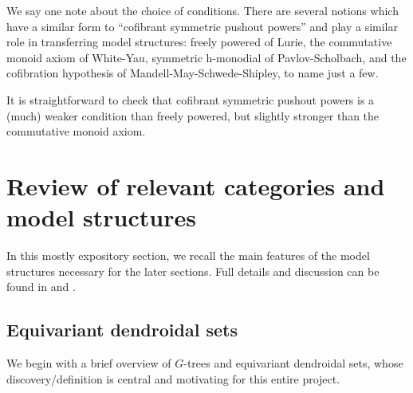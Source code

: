 \documentclass[a4paper,10pt
,draft
]{article}%
\renewcommand{\1}{\eta}%
\begin{document}
{  \begin{remark}
        We say one note about the choice of conditions. There are several notions which have a similar form to
        ``cofibrant symmetric pushout powers'' and play a similar role in transferring model structures:
        freely powered of Lurie,
        the commutative monoid axiom of White-Yau,
        symmetric h-monodial of Pavlov-Scholbach,
        and the cofibration hypothesis of Mandell-May-Schwede-Shipley,
        to name just a few.

        It is straightforward to check that cofibrant symmetric pushout powers is a (much) weaker condition than freely powered,
        but slightly stronger than the commutative monoid axiom.

  \end{remark}


} %









\newpage

\section{Review of relevant categories and model structures}

In this mostly expository section, we recall the main features of the model structures necessary for the later sections.
Full details and discussion can be found in \cite{BP_edss} and \cite{Per18}.


\subsection{Equivariant dendroidal sets}
\label{EDS_SEC}

We begin with a brief overview of $G$-trees and equivariant dendroidal sets, whose discovery/definition is central and motivating for this entire project.
\end{document}
